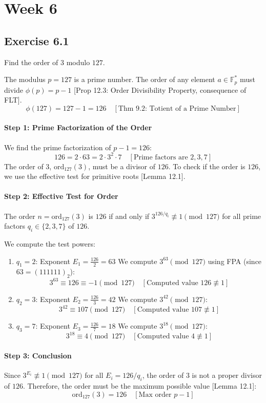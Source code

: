 \section*{Week 6}
\subsection*{Exercise 6.1}
Find the order of $3$ modulo $127$.

\begin{solution}
The modulus $p=127$ is a prime number.
The order of any element $a \in \mathbb{F}_p^*$ must divide $\phi(p) = p-1$ [Prop 12.3: Order Divisibility Property, consequence of FLT].
$$ \phi(127) = 127 - 1 = 126 \quad [\text{Thm 9.2: Totient of a Prime Number}] $$

\paragraph{Step 1: Prime Factorization of the Order}
We find the prime factorization of $p-1 = 126$:
$$ 126 = 2 \cdot 63 = 2 \cdot 3^2 \cdot 7 \quad [\text{Prime factors are } 2, 3, 7] \text{}$$
The order of $3$, $\mathrm{ord}_{127}(3)$, must be a divisor of $126$. To check if the order is $126$, we use the effective test for primitive roots [Lemma 12.1].

\paragraph{Step 2: Effective Test for Order}
The order $n = \mathrm{ord}_{127}(3)$ is $126$ if and only if $3^{126/q_i} \not\equiv 1 \pmod{127}$ for all prime factors $q_i \in \{2, 3, 7\}$ of $126$.

We compute the test powers:
\begin{enumerate}
    \item $q_1 = 2$: Exponent $E_1 = \frac{126}{2} = 63$
    We compute $3^{63} \pmod{127}$ using FPA (since $63 = (111111)_2$):
    $$ 3^{63} \equiv 126 \equiv -1 \pmod{127} \quad [\text{Computed value } 126 \not\equiv 1] \text{}$$
    \item $q_2 = 3$: Exponent $E_2 = \frac{126}{3} = 42$
    We compute $3^{42} \pmod{127}$:
    $$ 3^{42} \equiv 107 \pmod{127} \quad [\text{Computed value } 107 \not\equiv 1] \text{}$$
    \item $q_3 = 7$: Exponent $E_3 = \frac{126}{7} = 18$
    We compute $3^{18} \pmod{127}$:
    $$ 3^{18} \equiv 4 \pmod{127} \quad [\text{Computed value } 4 \not\equiv 1] \text{}$$
\end{enumerate}

\paragraph{Step 3: Conclusion}
Since $3^{E_i} \not\equiv 1 \pmod{127}$ for all $E_i = 126/q_i$, the order of $3$ is not a proper divisor of $126$.
Therefore, the order must be the maximum possible value [Lemma 12.1]:
$$ \mathrm{ord}_{127}(3) = 126 \quad [\text{Max order } p-1] \text{} $$
\end{solution}

